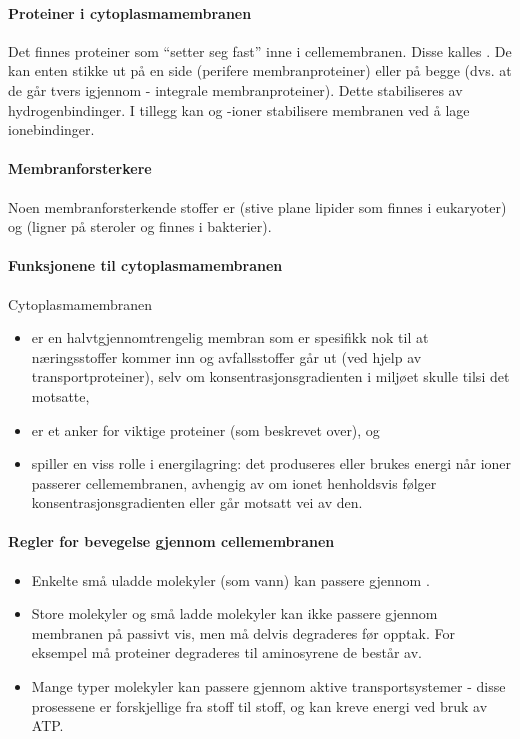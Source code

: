 \paragraph{Proteiner i cytoplasmamembranen} Det finnes proteiner som ``setter seg fast'' inne i cellemembranen. Disse kalles . De kan enten stikke ut på en side (perifere membranproteiner) eller på begge (dvs. at de går tvers igjennom - integrale membranproteiner). Dette stabiliseres av hydrogenbindinger. I tillegg kan  og -ioner stabilisere membranen ved å lage ionebindinger.

\paragraph{Membranforsterkere} Noen membranforsterkende stoffer er  (stive plane lipider som finnes i eukaryoter) og  (ligner på steroler og finnes i bakterier).

\paragraph{Funksjonene til cytoplasmamembranen} Cytoplasmamembranen
\begin{itemize}[nolistsep,noitemsep]
	\item er en halvtgjennomtrengelig membran som er spesifikk nok til at næringsstoffer kommer inn og avfallsstoffer går ut (ved hjelp av transportproteiner), selv om konsentrasjonsgradienten i miljøet skulle tilsi det motsatte,
	\item er et anker for viktige proteiner (som beskrevet over), og
	\item spiller en viss rolle i energilagring: det produseres eller brukes energi når ioner passerer cellemembranen, avhengig av om ionet henholdsvis følger konsentrasjonsgradienten eller går motsatt vei av den.
\end{itemize}

\paragraph{Regler for bevegelse gjennom cellemembranen}
\begin{itemize}[nolistsep,noitemsep]
	\item Enkelte små uladde molekyler (som vann) kan passere gjennom .
	\item Store molekyler og små ladde molekyler kan ikke passere gjennom membranen på passivt vis, men må delvis degraderes før opptak. For eksempel må proteiner degraderes til aminosyrene de består av.
	\item Mange typer molekyler kan passere gjennom aktive transportsystemer - disse prosessene er forskjellige fra stoff til stoff, og kan kreve energi ved bruk av ATP.
\end{itemize}

